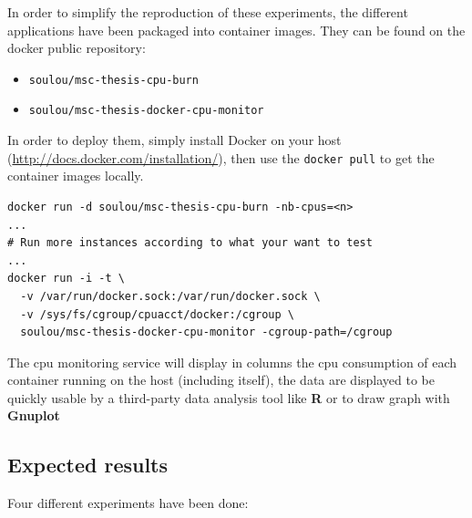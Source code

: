 In order to simplify the reproduction of these experiments, the different
applications have been packaged into container images. They can be found on the
docker public repository:

\begin{itemize}
	\item{\texttt{soulou/msc-thesis-cpu-burn}}
	\item{\texttt{soulou/msc-thesis-docker-cpu-monitor}}
\end{itemize}

In order to deploy them, simply install Docker on your host
(\url{http://docs.docker.com/installation/}), then use the \texttt{docker pull}
to get the container images locally.

\vspace{1em}

\begin{lstlisting}
docker run -d soulou/msc-thesis-cpu-burn -nb-cpus=<n>
...
# Run more instances according to what your want to test
...
docker run -i -t \
  -v /var/run/docker.sock:/var/run/docker.sock \
  -v /sys/fs/cgroup/cpuacct/docker:/cgroup \
  soulou/msc-thesis-docker-cpu-monitor -cgroup-path=/cgroup
\end{lstlisting}

The cpu monitoring service will display in columns the cpu consumption
of each container running on the host (including itself), the data are
displayed to be quickly usable by a third-party data analysis tool like
\textbf{R} or to draw graph with \textbf{Gnuplot}

\subsection{Expected results}

Four different experiments have been done:

